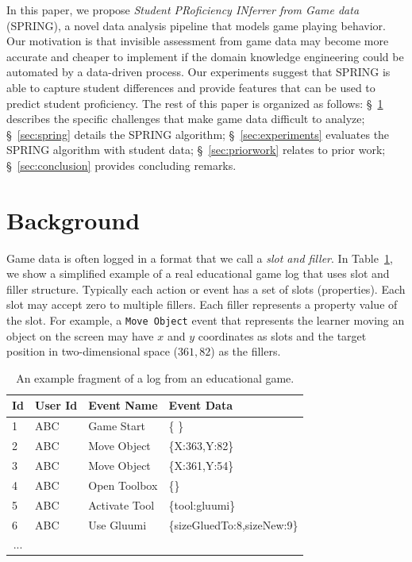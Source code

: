 \documentclass{sigchi}
\def\algname{SPRING\xspace}
\begin{document}
	
	In this paper, we propose \textit{Student PRoficiency INferrer from Game data} (SPRING), a novel data analysis pipeline that models game playing behavior.
	Our motivation is that invisible assessment from game data may become more accurate and cheaper to implement if the domain knowledge engineering could be automated by a data-driven process.
	Our experiments suggest that \algname is able to capture student differences and provide features that can be used to predict student proficiency.
	The rest of this paper is organized as follows:
	\S~\ref{sec:game_data} describes the specific challenges that make game data difficult to analyze;
	\S~\ref{sec:spring} details the SPRING algorithm;
	\S~\ref{sec:experiments} evaluates the SPRING algorithm with student data;
	\S~\ref{sec:priorwork} relates to prior work;
	\S~\ref{sec:conclusion} provides concluding remarks.
	
	
	\section{Background}
	\label{sec:game_data}
	Game data is often logged  in a format that we call a \textit{slot and filler}.
	In Table~\ref{tbl:log_example}, we show a simplified example of a real educational game log that uses slot and filler structure.
	Typically each action or event has a set of slots (properties).
	Each slot may accept zero to multiple fillers. 
	Each filler represents a property value of the slot.
	For example, a \texttt{Move Object} event  that represents the learner moving an object on the screen may have $x$ and $y$ coordinates as slots and the target position in two-dimensional space ($361, 82$) as the fillers.
	\newline
	
	\begin{table}[tbh]
		\begin{tabular}{@{}llll@{}}
			\toprule
			\textbf{Id}             & \textbf{User Id} & \textbf{Event Name} & \textbf{Event Data}        \\ \midrule
			1                       & ABC              & Game Start          & \{ \}                        \\
			2                       & ABC              & Move Object         & \{X:363,Y:82\} \\
			3                       & ABC              & Move Object         & \{X:361,Y:54\} \\
			4                       & ABC              & Open Toolbox        & \{\}        \\
			5                       & ABC              & Activate Tool        & \{tool:gluumi\}        \\
			6                       & ABC              & Use Gluumi        & \{sizeGluedTo:8,sizeNew:9\} \\        
			\multicolumn{1}{c}{...} &                  &                     &                            \\ \bottomrule
		\end{tabular}
		\caption{An example fragment of a log from an educational game. \label{tbl:log_example}}
	\end{table}
	
\end{document}
